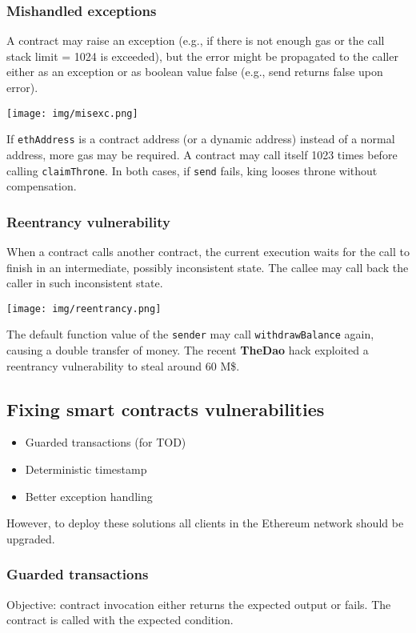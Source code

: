 \documentclass[a4paper, 10pt, titlepage]{article}
\begin{document}
\subsubsection{Mishandled exceptions}
A contract may raise an exception (e.g., if there is not enough gas or the call stack limit = 1024 is exceeded), but the error might be propagated to the caller either as an exception or as boolean value false (e.g., send returns false upon error).
\begin{center}
\texttt{[image: img/misexc.png]}
\end{center}
If \lstinline|ethAddress| is a contract address (or a dynamic address) instead of a normal address, more gas may be required. A contract may call itself 1023 times before calling \lstinline|claimThrone|. In both cases, if \lstinline|send| fails, king looses throne without compensation.

\subsubsection{Reentrancy vulnerability}
When a contract calls another contract, the current execution waits for the call to finish in an intermediate, possibly inconsistent state. The callee may call back the caller in such inconsistent state. 
\begin{center}
\texttt{[image: img/reentrancy.png]}
\end{center}
The default function value of the \lstinline|sender| may call \lstinline|withdrawBalance| again, causing a double transfer of money. The recent \textbf{TheDao} hack exploited a reentrancy vulnerability to steal around 60 M\$.

\subsection{Fixing smart contracts vulnerabilities}
\begin{itemize}
\item Guarded transactions (for TOD)
\item Deterministic timestamp
\item Better exception handling
\end{itemize}
However, to deploy these solutions all clients in the Ethereum network should be upgraded.

\subsubsection{Guarded transactions}
Objective: contract invocation either returns the expected output or fails. The contract is called with the expected condition.
\end{document}

